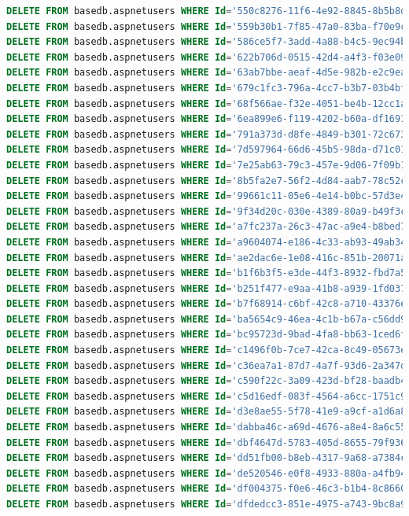 \documentclass[12pt]{article}
\begin{document}
\begin{lstlisting}[language=SQL]
DELETE FROM basedb.aspnetusers WHERE Id='550c8276-11f6-4e92-8845-8b5b8d8f0008';
DELETE FROM basedb.aspnetusers WHERE Id='559b30b1-7f85-47a0-83ba-f70e9c3d35aa';
DELETE FROM basedb.aspnetusers WHERE Id='586ce5f7-3add-4a88-b4c5-9ec94bd79d70';
DELETE FROM basedb.aspnetusers WHERE Id='622b706d-0515-42d4-a4f3-f03e0990daca';
DELETE FROM basedb.aspnetusers WHERE Id='63ab7bbe-aeaf-4d5e-982b-e2c9ea73938d';
DELETE FROM basedb.aspnetusers WHERE Id='679c1fc3-796a-4cc7-b3b7-03b4bf0e9d13';
DELETE FROM basedb.aspnetusers WHERE Id='68f566ae-f32e-4051-be4b-12cc1a23ec01';
DELETE FROM basedb.aspnetusers WHERE Id='6ea899e6-f119-4202-b60a-df1691472fa4';
DELETE FROM basedb.aspnetusers WHERE Id='791a373d-d8fe-4849-b301-72c67383ed58';
DELETE FROM basedb.aspnetusers WHERE Id='7d597964-66d6-45b5-98da-d71c01b12f67';
DELETE FROM basedb.aspnetusers WHERE Id='7e25ab63-79c3-457e-9d06-7f09b164f132';
DELETE FROM basedb.aspnetusers WHERE Id='8b5fa2e7-56f2-4d84-aab7-78c52ca4c1db';
DELETE FROM basedb.aspnetusers WHERE Id='99661c11-05e6-4e14-b0bc-57d3e458ebcb';
DELETE FROM basedb.aspnetusers WHERE Id='9f34d20c-030e-4389-80a9-b49f3c43143b';
DELETE FROM basedb.aspnetusers WHERE Id='a7fc237a-26c3-47ac-a9e4-b8bed7fd3824';
DELETE FROM basedb.aspnetusers WHERE Id='a9604074-e186-4c33-ab93-49ab34e39ce1';
DELETE FROM basedb.aspnetusers WHERE Id='ae2dac6e-1e08-416c-851b-20071a792672';
DELETE FROM basedb.aspnetusers WHERE Id='b1f6b3f5-e3de-44f3-8932-fbd7a53f6b3c';
DELETE FROM basedb.aspnetusers WHERE Id='b251f477-e9aa-41b8-a939-1fd0374dc310';
DELETE FROM basedb.aspnetusers WHERE Id='b7f68914-c6bf-42c8-a710-43376e8a8586';
DELETE FROM basedb.aspnetusers WHERE Id='ba5654c9-46ea-4c1b-b67a-c56dd9bcca5c';
DELETE FROM basedb.aspnetusers WHERE Id='bc95723d-9bad-4fa8-bb63-1ced6ffc5c80';
DELETE FROM basedb.aspnetusers WHERE Id='c1496f0b-7ce7-42ca-8c49-05673eceee83';
DELETE FROM basedb.aspnetusers WHERE Id='c36ea7a1-87d7-4a7f-93d6-2a347de37b5d';
DELETE FROM basedb.aspnetusers WHERE Id='c590f22c-3a09-423d-bf28-baadb449a369';
DELETE FROM basedb.aspnetusers WHERE Id='c5d16edf-083f-4564-a6cc-1751c98ecc3b';
DELETE FROM basedb.aspnetusers WHERE Id='d3e8ae55-5f78-41e9-a9cf-a1d6a8c2ec59';
DELETE FROM basedb.aspnetusers WHERE Id='dabba46c-a69d-4676-a8e4-8a6c5598ab76';
DELETE FROM basedb.aspnetusers WHERE Id='dbf4647d-5783-405d-8655-79f9369c4c8e';
DELETE FROM basedb.aspnetusers WHERE Id='dd51fb00-b8eb-4317-9a68-a7384caa3d3b';
DELETE FROM basedb.aspnetusers WHERE Id='de520546-e0f8-4933-880a-a4fb947a3684';
DELETE FROM basedb.aspnetusers WHERE Id='df004375-f0e6-46c3-b1b4-8c8660705c75';
DELETE FROM basedb.aspnetusers WHERE Id='dfdedcc3-851e-4975-a743-9bc8a91078ef';

\end{lstlisting}
\end{document}

